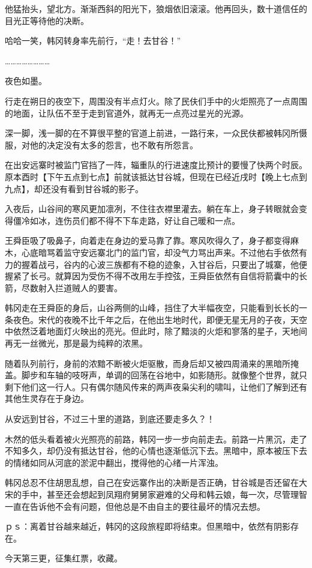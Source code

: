 他猛抬头，望北方。渐渐西斜的阳光下，狼烟依旧滚滚。他再回头，数十道信任的目光正等待他的决断。

哈哈一笑，韩冈转身率先前行，“走！去甘谷！”

……………………

夜色如墨。

行走在朔日的夜空下，周围没有半点灯火。除了民伕们手中的火炬照亮了一点周围的地面，让队伍不至于走到官道外，就再无一点亮过星光的光源。

深一脚，浅一脚的在不算很平整的官道上前进，一路行来，一众民伕都被韩冈所慑服，对他的决定没有太多的怨言，也不敢有所怨言。

在出安远寨时被监门官挡了一阵，辎重队的行进速度比预计的要慢了快两个时辰。原本酉时【下午五点到七点】前就该抵达甘谷城，但现在已经近戌时【晚上七点到九点】，却还没有看到甘谷城的影子。

入夜后，山谷间的寒风更加凛冽，不住往衣襟里灌去。躺在车上，身子转眼就会变得僵冷如冰，连伤员们都不得不下车走路，好让自己暖和一点。

王舜臣吸了吸鼻子，向着走在身边的爱马靠了靠。寒风吹得久了，身子都变得麻木，心底暗骂着监守安远寨北门的监门官，却没气力骂出声来。不过他右手依然有力的握着战弓，谷内的心波三族都有不稳的迹象，入甘谷后，只要出了城寨，他便握紧了长弓。就算因为受伤不得不改用左手控弦，王舜臣依然有自信将箭囊中的长箭，尽数射入拦道贼人的要害。

韩冈走在王舜臣的身后，山谷两侧的山峰，挡住了大半幅夜空，只能看到长长的一条夜色。宋代的夜晚不比千年之后，在他出生地时代，即便无星无月的子夜，天空中依然泛着地面灯火映出的亮光。但此时，除了黯淡的火炬和寥落的星子，天地间再无一丝微光，那是最为纯粹的浓黑。

随着队列前行，身前的浓黯不断被火炬驱散，而身后却又被四周涌来的黑暗所掩盖。脚步和车轴的吱呀声，单调的回荡在谷地中，如影随形。就像整个世界，就只剩下他们这一行人。只有偶尔随风传来的两声夜枭尖利的啸叫，让他们了解到还有其他生灵存在于身边。

从安远到甘谷，不过三十里的道路，到底还要走多久？！

木然的低头看着被火光照亮的前路，韩冈一步一步向前走去。前路一片黑沉，走了不知多久，却仍没有抵达甘谷，他的心情也逐渐低沉下去。黑暗中，原本被压下去的情绪如同从河底的淤泥中翻出，搅得他的心绪一片浑浊。

韩冈总忍不住胡思乱想，自己在安远寨作出的决断是否正确，甘谷城是否还留在大宋的手中，甚至还会想起到凤翔府舅舅家避难的父母和韩云娘，每一次，尽管理智一直在告诉他不会有问题，但他总是不由自主的要往最坏的情况去想。

ｐｓ：离着甘谷越来越近，韩冈的这段旅程即将结束。但黑暗中，依然有阴影存在。

今天第三更，征集红票，收藏。

